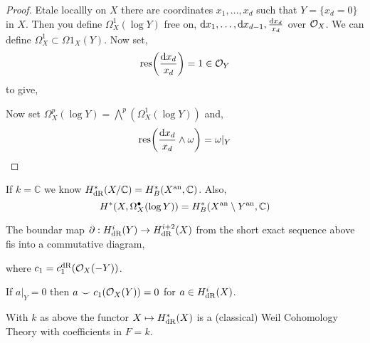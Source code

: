 \documentclass[12pt]{article}
\begin{document}
\begin{proof}
Etale locallly on $X$ there are coordinates $x_1, \dots, x_d$ such that $Y = \{ x_d = 0 \}$ in $X$. Then you define $\Omega^1_X(\log{Y})$ free on, $\mathrm{d} x_1, \dots, \mathrm{d} x_{d-1}, \frac{\mathrm{d} x_d}{x_d}$ over $\mathcal{O}_{X}$. We can define $\Omega_X^1 \subset \Omega1_X(Y)$. Now set,
\[ \mathrm{res}{\left( \frac{\mathrm{d} x_d}{x_d} \right)} = 1 \in \mathcal{O}_{Y} \]
to give,
\begin{center}
\end{center}
Now set $\Omega^p_X(\log{Y}) = \bigwedge^p (\Omega^1_X(\log{Y}))$ and,
\[ \mathrm{res}{\left( \frac{\mathrm{d} x_d}{x_d} \wedge \omega \right)} = \omega |_Y \]
\end{proof}

\renewcommand{\C}{\mathbb{C}}

\begin{remark}
If $k = \C$ we know $H^*_{\dR}(X/\C) = H^*_B(X^\an, \C)$. Also,
\[ H^*(X, \Omega^\bullet_X(\log{Y})) = H^*_B(X^\an \setminus Y^\an, \C) \]
\end{remark}

\begin{proposition}
The boundar map $\partial : H^i_{\mathrm{dR}}(Y) \to H^{i + 2}_{\mathrm{dR}}(X)$ from the short exact sequence above fis into a commutative diagram,
\begin{center}
\end{center}
where $c_1 = c_1^{\mathrm{dR}}(\mathcal{O}_{X}(-Y))$. 
\end{proposition}

\begin{corollary}
If $a|_Y = 0$ then $a \smile c_1(\mathcal{O}_{X}(Y)) = 0$ for $a \in H^i_{\mathrm{dR}}(X)$.
\end{corollary}

\begin{theorem}
With $k$ as above the functor $X \mapsto H^*_{\mathrm{dR}}(X)$ is a (classical) Weil Cohomology Theory with coefficients in $F = k$. 
\end{theorem}
\end{document}
